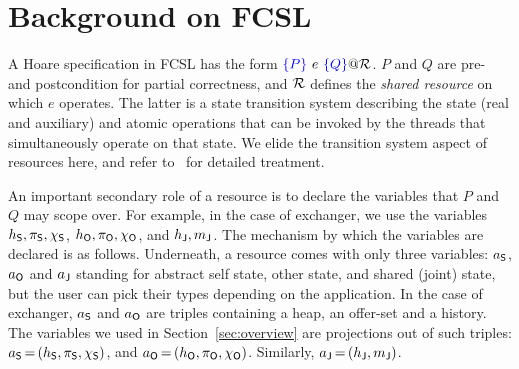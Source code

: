\section{Background on FCSL}
\label{sec:background}

A Hoare specification in FCSL has the form $\textcolor{blue}{\left\{{P}\right\}}\ e\ \textcolor{blue}{\left\{{Q}\right\}} @
\mathcal{R}$. $P$ and $Q$ are pre- and postcondition for partial
correctness, and $\mathcal{R}$ defines the \emph{shared resource} on which
$e$ operates. 
%
%
The latter is a state transition system describing the state (real and
auxiliary) and atomic operations that can be invoked by the threads
that simultaneously operate on that state. We elide the transition
system aspect of resources here, and refer
to~\cite{Nanevski-al:ESOP14} for detailed treatment.

An important secondary role of a resource is to declare the variables
that $P$ and $Q$ may scope over. For example, in the case of
exchanger, we use the variables $h_{\mathsf{S}}, \pi_{\mathsf{S}}, \chi_{\mathsf{S}}$, $h_{\mathsf{O}},
\pi_{\mathsf{O}}, \chi_{\mathsf{O}}$, and $h_{\mathsf{J}}, {m_{\mathsf{J}}}$.
%
The mechanism by which the variables are declared is as
follows. Underneath, a resource comes with only three variables:
$a_{\mathsf{S}}$, $a_{\mathsf{O}}$ and $a_{\mathsf{J}}$ standing for abstract self state,
other state, and shared (joint) state, but the user can pick their
types depending on the application. In the case of exchanger, $a_{\mathsf{S}}$
and $a_{\mathsf{O}}$ are triples containing a heap, an offer-set and a
history. The variables we used in Section~\ref{sec:overview} are
projections out of such triples: $a_{\mathsf{S}}\,{=}\,(h_{\mathsf{S}}, \pi_{\mathsf{S}},
\chi_{\mathsf{S}})$, and $a_{\mathsf{O}}\,{=}\,(h_{\mathsf{O}}, \pi_{\mathsf{O}}, \chi_{\mathsf{O}})$. Similarly,
$a_{\mathsf{J}}\,{=}\,(h_{\mathsf{J}}, {m_{\mathsf{J}}})$.

